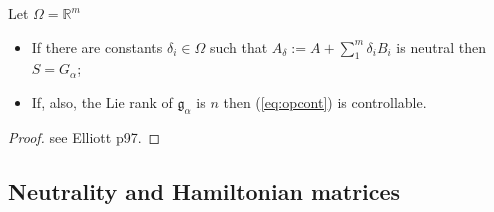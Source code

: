 \begin{theorem}
Let $\Omega = \mathbb{R}^m$
\begin{itemize}
 \item If there are constants $\delta_i \in \Omega$ such that $A_\delta := A+\sum_1^m\delta_iB_i$ is neutral then $S = G_\alpha$;
\item If, also, the Lie rank of $\mathfrak{g}_\alpha$ is $n$ then (\ref{eq:opcont}) is controllable.
\end{itemize}
\end{theorem}
\begin{proof}
 see Elliott p97.
\end{proof}

\subsection{Neutrality and Hamiltonian matrices}



